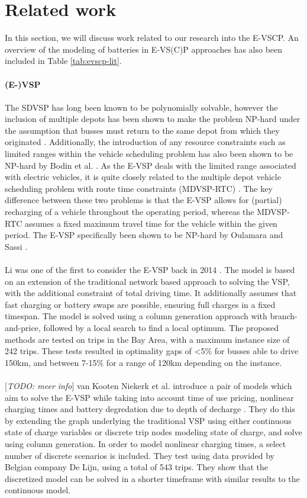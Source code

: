\documentclass[ht]{article}
\newcommand{\todo}[1]{{\color{red}[\textit{TODO: #1}]}}
\begin{document}
\section{Related work}
In this section, we will discuss work related to our research into the E-VSCP.  An overview of the modeling of batteries in E-VS(C)P approaches has also been included in Table \ref{tab:evscp-lit}.  \\\\ 
\noindent \textbf{(E-)VSP} \\\\
The SDVSP has long been known to be polynomially solvable, however the inclusion of multiple depots has been shown to make the problem NP-hard under the assumption that busses must return to the same depot from which they originated \cite{Bunte2009}. Additionally, the introduction of any resource constraints such as limited ranges within the vehicle scheduling problem has also been shown to be NP-hard by Bodin et al. \cite{Bodin1983}. As the E-VSP deals with the limited range associated with electric vehicles, it is quite closely related to the multiple depot vehicle scheduling problem with route time constraints (MDVSP-RTC) \cite{Haghani2002}. The key difference between these two problems is that the E-VSP allows for (partial) recharging of a vehicle throughout the operating period, whereas the MDVSP-RTC assumes a fixed maximum travel time for the vehicle within the given period. The E-VSP specifically been shown to be NP-hard by Oulamara and Sassi \cite{Sassi2014}. \\\\
\cite{Haghani2002}
Li was one of the first to consider the E-VSP back in 2014 \cite{Li2014}. The model is based on an extension of the traditional network based approach to solving the VSP, with the additional constraint of total driving time. It additionally assumes that fast charging or battery swaps are possible, ensuring full charges in a fixed timespan. The model is solved using a column generation approach with branch-and-price, followed by a local search to find a local optimum. The proposed methods are tested on trips in the Bay Area, with a maximum instance size of 242 trips. These tests resulted in optimality gaps of <5\% for busses able to drive 150km, and between 7-15\% for a range of 120km depending on the instance.  \\\\
\todo{meer info} van Kooten Niekerk et al. introduce a pair of models which aim to solve the E-VSP while taking into account time of use pricing, nonlinear charging times and battery degredation due to depth of decharge \cite{vanKootenNiekerk2017}. They do this by extending the graph underlying the traditional VSP using either continuous state of charge variables or discrete trip nodes modeling state of charge, and solve using column generation. In order to model nonlinear charging times, a select number of discrete scenarios is included. They test using data provided by Belgian company De Lijn, using a total of 543 trips. They show that the discretized model can be solved in a shorter timeframe with similar results to the continuous model. \\\\
\end{document}
